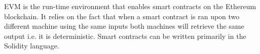EVM is the run-time environment that enables smart contracts on the Ethereum blockchain. It relies on the fact that when a smart contract is ran upon two different machine using the same inputs both machines will retrieve the same output i.e. it is deterministic. Smart contracts can be written primarily in the Solidity language.
